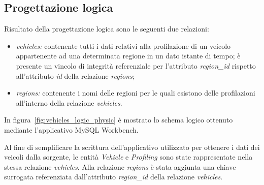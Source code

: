 \subsection{Progettazione logica}

Risultato della progettazione logica sono le seguenti due relazioni:
\begin{itemize}
\item \textit{vehicles:} contenente tutti i dati relativi alla profilazione di un veicolo
appartenente ad una determinata regione in un dato istante di tempo; è presente un
vincolo di integrità referenziale per l'attributo \textit{region\_id} rispetto
all'attributo \textit{id} della relazione \textit{regions};
\item \textit{regions:} contenente i nomi delle regioni per le quali esistono delle
profilazioni all'interno della relazione \textit{vehicles}.
\end{itemize}
In figura~\ref{fig:vehicles_logic_physic} è mostrato lo schema logico ottenuto mediante
l'applicativo MySQL Workbench.

Al fine di semplificare la scrittura dell'applicativo utilizzato per ottenere i dati
dei veicoli dalla sorgente, le entità \textit{Vehicle} e \textit{Profiling} 
sono state rappresentate nella stessa relazione \textit{vehicles}.
Alla relazione \textit{regions} è stata aggiunta una chiave surrogata referenziata
dall'attributo \textit{region\_id} della relazione \textit{vehicles}.

